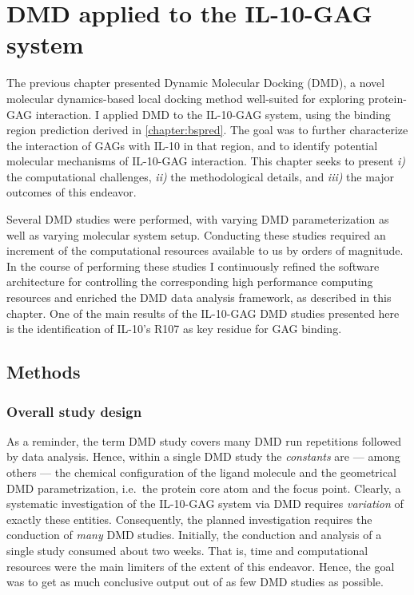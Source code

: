 \chapter{DMD applied to the IL-10-GAG system}

The previous chapter presented Dynamic Molecular Docking (DMD), a novel
molecular dynamics-based local docking method well-suited for exploring
protein-GAG interaction. I applied DMD to the IL-10-GAG system, using the
binding region prediction derived in \cref{chapter:bspred}. The goal was to
further characterize the interaction of GAGs with IL-10 in that region, and to
identify potential molecular mechanisms of IL-10-GAG interaction. This chapter
seeks to present \textit{i)} the computational challenges, \textit{ii)} the
methodological details, and \textit{iii)} the major outcomes of this endeavor.

Several DMD studies were performed, with varying DMD parameterization as well as
varying molecular system setup. Conducting these studies required an increment
of the computational resources available to us by orders of magnitude. In the
course of performing these studies I continuously refined the software
architecture for controlling the corresponding high performance computing
resources and enriched the DMD data analysis framework, as described in this
chapter. One of the main results of the IL-10-GAG DMD studies presented here is
the identification of IL-10's R107 as key residue for GAG binding.


\section{Methods}

\subsection{Overall study design}
\label{dmdil10:overallmethod}

As a reminder, the term DMD study covers many DMD run repetitions followed by
data analysis. Hence, within a single DMD study the \textit{constants} are ---
among others --- the chemical configuration of the ligand molecule and the
geometrical DMD parametrization, i.e.\ the protein core atom and the focus
point. Clearly, a systematic investigation of the IL-10-GAG system via DMD
requires \textit{variation} of exactly these entities. Consequently, the planned
investigation requires the conduction of \textit{many} DMD studies. Initially,
the conduction and analysis of a single study consumed about two weeks. That is,
time and computational resources were the main limiters of the extent of this
endeavor. Hence, the goal was to get as much conclusive output out of as few DMD
studies as possible.

